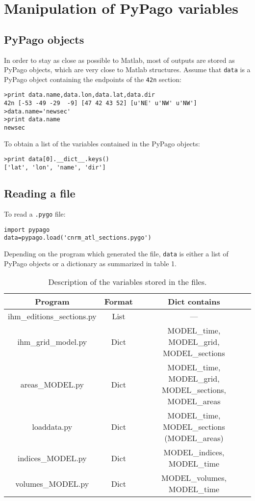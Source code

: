 \section{Manipulation of PyPago variables}

\subsection{PyPago objects}

In order to stay as close as possible to Matlab, most of outputs are stored as PyPago objects, which are very close to Matlab structures. Assume that \verb+data+ is a PyPago object containing the endpoints of the \verb+42n+ section:

\begin{verbatim}
>print data.name,data.lon,data.lat,data.dir
42n [-53 -49 -29  -9] [47 42 43 52] [u'NE' u'NW' u'NW']
>data.name='newsec'
>print data.name
newsec
\end{verbatim}

To obtain a list of the variables contained in the PyPago objects:

\begin{verbatim}
>print data[0].__dict__.keys()
['lat', 'lon', 'name', 'dir']
\end{verbatim}

\subsection{Reading a file}

To read a \verb+.pygo+ file:

\begin{verbatim}
import pypago
data=pypago.load('cnrm_atl_sections.pygo')
\end{verbatim}

Depending on the program which generated the file, \verb+data+ is either a list of PyPago objects or a dictionary as summarized in table 1.

\begin{table}[h!]
\centering
\begin{tabular}{ccc}
Program & Format & Dict contains \\
\hline
ihm\_editions\_sections.py & List & ---\\
ihm\_grid\_model.py & Dict & MODEL\_time, MODEL\_grid, MODEL\_sections\\
areas\_MODEL.py & Dict & MODEL\_time, MODEL\_grid, MODEL\_sections, MODEL\_areas\\
loaddata.py & Dict & MODEL\_time, MODEL\_sections (MODEL\_areas)\\
indices\_MODEL.py & Dict & MODEL\_indices, MODEL\_time\\
volumes\_MODEL.py & Dict & MODEL\_volumes, MODEL\_time\\
\end{tabular}
\caption{Description of the variables stored in the files.}
\label{table1}
\end{table}

